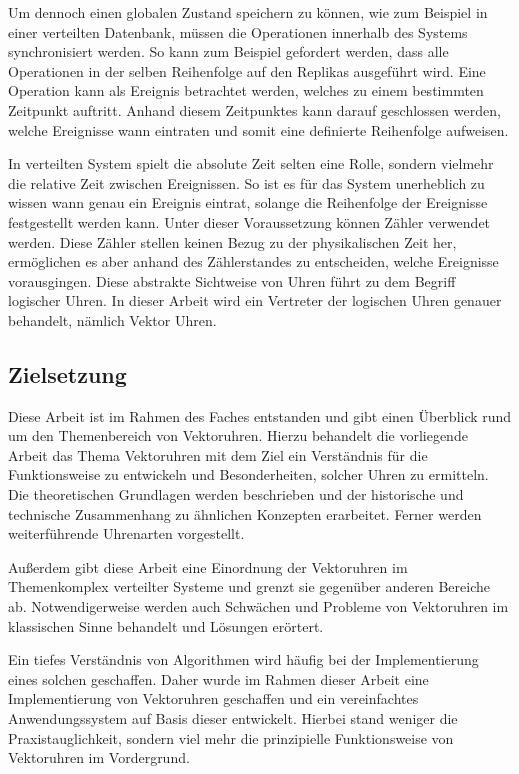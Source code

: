 Um dennoch einen globalen Zustand speichern zu können, wie zum Beispiel in einer verteilten Datenbank, müssen die Operationen innerhalb des Systems synchronisiert werden. So kann zum Beispiel gefordert werden, dass alle Operationen in der selben Reihenfolge auf den Replikas ausgeführt wird. Eine Operation kann als Ereignis betrachtet werden, welches zu einem bestimmten Zeitpunkt auftritt. Anhand diesem Zeitpunktes kann darauf geschlossen werden, welche Ereignisse wann eintraten und somit eine definierte Reihenfolge aufweisen.

In verteilten System spielt die absolute Zeit selten eine Rolle, sondern vielmehr die relative Zeit zwischen Ereignissen.
So ist es für das System unerheblich zu wissen wann genau ein Ereignis eintrat, solange die Reihenfolge der Ereignisse festgestellt werden kann. Unter dieser Voraussetzung können Zähler verwendet werden. Diese Zähler stellen keinen Bezug zu der physikalischen Zeit her, ermöglichen es aber anhand des Zählerstandes zu entscheiden, welche Ereignisse vorausgingen.
Diese abstrakte Sichtweise von Uhren führt zu dem Begriff logischer Uhren. In dieser Arbeit wird ein Vertreter der logischen Uhren genauer behandelt, nämlich Vektor Uhren.

\subsection{Zielsetzung}
Diese Arbeit ist im Rahmen des Faches  entstanden und gibt einen Überblick rund um den Themenbereich von Vektoruhren.
Hierzu behandelt die vorliegende Arbeit das Thema Vektoruhren mit dem Ziel ein Verständnis für die Funktionsweise zu entwickeln und Besonderheiten, solcher Uhren zu ermitteln.
Die theoretischen Grundlagen werden beschrieben und der historische und technische Zusammenhang zu ähnlichen Konzepten erarbeitet.
Ferner werden weiterführende Uhrenarten vorgestellt.

Außerdem gibt diese Arbeit eine Einordnung der Vektoruhren im Themenkomplex verteilter Systeme und grenzt sie gegenüber anderen Bereiche ab.
Notwendigerweise werden auch Schwächen und Probleme von Vektoruhren im klassischen Sinne behandelt und Lösungen erörtert.

Ein tiefes Verständnis von Algorithmen wird häufig bei der Implementierung eines solchen geschaffen.
Daher wurde im Rahmen dieser Arbeit eine Implementierung von Vektoruhren geschaffen und ein vereinfachtes Anwendungssystem auf Basis dieser entwickelt.
Hierbei stand weniger die Praxistauglichkeit, sondern viel mehr die prinzipielle Funktionsweise von Vektoruhren im Vordergrund.

